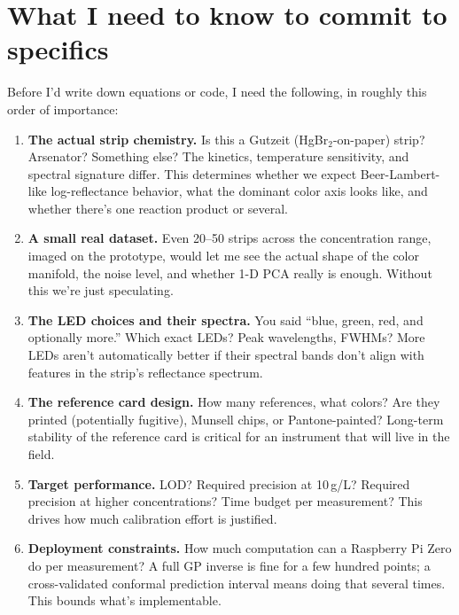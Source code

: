 \documentclass[11pt,letterpaper]{article}
\begin{document}
\section*{What I need to know to commit to specifics}

Before I'd write down equations or code, I need the following, in roughly
this order of importance:

\begin{enumerate}
  \item \textbf{The actual strip chemistry.} Is this a Gutzeit
    (HgBr$_2$-on-paper) strip? Arsenator? Something else? The kinetics,
    temperature sensitivity, and spectral signature differ. This determines
    whether we expect Beer-Lambert-like log-reflectance behavior, what the
    dominant color axis looks like, and whether there's one reaction
    product or several.
  \item \textbf{A small real dataset.} Even 20--50 strips across the
    concentration range, imaged on the prototype, would let me see the
    actual shape of the color manifold, the noise level, and whether 1-D
    PCA really is enough. Without this we're just speculating.
  \item \textbf{The LED choices and their spectra.} You said ``blue, green,
    red, and optionally more.'' Which exact LEDs? Peak wavelengths, FWHMs?
    More LEDs aren't automatically better if their spectral bands don't
    align with features in the strip's reflectance spectrum.
  \item \textbf{The reference card design.} How many references, what
    colors? Are they printed (potentially fugitive), Munsell chips, or
    Pantone-painted? Long-term stability of the reference card is critical
    for an instrument that will live in the field.
  \item \textbf{Target performance.} LOD? Required precision at
    10\,\textmu g/L? Required precision at higher concentrations? Time
    budget per measurement? This drives how much calibration effort is
    justified.
  \item \textbf{Deployment constraints.} How much computation can a
    Raspberry Pi Zero do per measurement? A full GP inverse is fine for a
    few hundred points; a cross-validated conformal prediction interval
    means doing that several times. This bounds what's implementable.
\end{enumerate}

\end{document}
